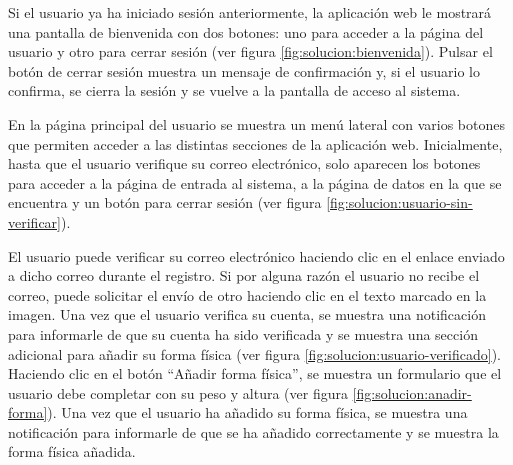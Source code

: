 

Si el usuario ya ha iniciado sesión anteriormente, la aplicación web le mostrará una pantalla de
bienvenida con dos botones: uno para acceder a la página del usuario y otro para cerrar sesión
(ver figura \ref{fig:solucion:bienvenida}). Pulsar el botón de cerrar sesión muestra un mensaje
de confirmación y, si el usuario lo confirma, se cierra la sesión y se vuelve a la pantalla de
acceso al sistema.


En la página principal del usuario se muestra un menú lateral con varios botones que permiten
acceder a las distintas secciones de la aplicación web. Inicialmente, hasta que el usuario
verifique su correo electrónico, solo aparecen los botones para acceder a la página de
entrada al sistema, a la página de datos en la que se encuentra y un botón para cerrar sesión
(ver figura \ref{fig:solucion:usuario-sin-verificar}).


El usuario puede verificar su correo electrónico haciendo clic en el enlace enviado a dicho
correo durante el registro. Si por alguna razón el usuario no recibe el correo, puede solicitar
el envío de otro haciendo clic en el texto marcado en la imagen. Una vez que el usuario verifica
su cuenta, se muestra una notificación para informarle de que su cuenta ha sido verificada y se
muestra una sección adicional para añadir su forma física (ver figura
\ref{fig:solucion:usuario-verificado}). Haciendo clic en el botón \enquote{Añadir forma física}, se
muestra un formulario que el usuario debe completar con su peso y altura (ver figura
\ref{fig:solucion:anadir-forma}). Una vez que el usuario ha añadido su forma física, se
muestra una notificación para informarle de que se ha añadido correctamente y se muestra la
forma física añadida.

